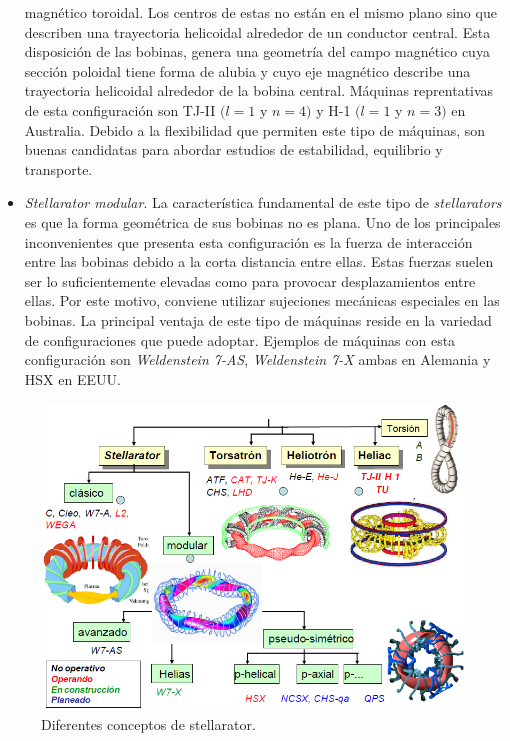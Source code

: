 \begin{itemize}
    magnético toroidal. Los centros de estas no están en el mismo plano sino que describen
    una trayectoria helicoidal alrededor de un conductor central. Esta disposición de
    las bobinas, genera una geometría del campo magnético cuya sección poloidal tiene forma
    de alubia y cuyo eje magnético describe una trayectoria helicoidal alrededor
    de la bobina central. Máquinas reprentativas de esta configuración son TJ-II $(l=1$ y
    $n=4)$ y H-1 $(l=1$ y $n=3)$ en Australia.
    Debido a la flexibilidad que permiten este tipo de máquinas, son buenas candidatas
    para abordar estudios de estabilidad, equilibrio y transporte.
    \item \textit{Stellarator modular}. La característica fundamental de este tipo de \textit{stellarators} es que
    la forma geométrica de sus bobinas no es plana. Uno de los principales inconvenientes
    que presenta esta configuración es la fuerza de interacción entre las bobinas debido a la
    corta distancia entre ellas. Estas fuerzas suelen ser lo suficientemente elevadas como
    para provocar desplazamientos entre ellas. Por este motivo, conviene utilizar sujeciones
    mecánicas especiales en las bobinas.
    La principal ventaja de este tipo de máquinas reside en la variedad de configuraciones
    que puede adoptar. Ejemplos de máquinas con esta configuración son \textit{Weldenstein 7-AS},
    \textit{Weldenstein 7-X} ambas en Alemania y HSX en EEUU.
\end{itemize}
\begin{figure}[H]
    \centering
    \includegraphics[scale=0.6]{img/tree.png}
    \caption[Diferentes conceptos de stellarator]{Diferentes conceptos de stellarator.}
    \label{fig:tree}
\end{figure}
